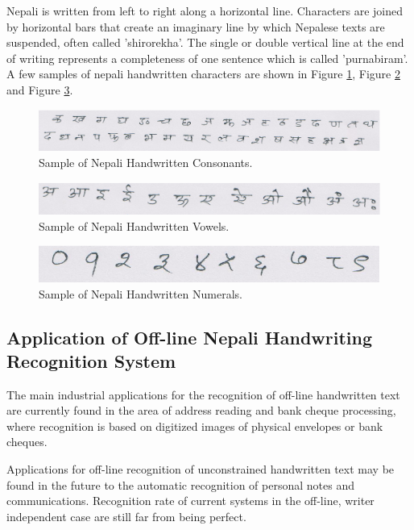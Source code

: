 Nepali is written from left to right along a horizontal line. Characters are joined by horizontal bars that create an imaginary line by which Nepalese texts are suspended, often called 'shirorekha’. The single or double vertical line at the end of writing represents a completeness of one sentence which is called 'purnabiram'. A few samples of nepali handwritten characters are shown in Figure \ref{figure_sample_ka_kha}, Figure \ref{figure_sample_a_aa} and Figure \ref{figure_sample_one_two}.
\begin{figure}[hbtp]
\centering
\includegraphics[width=\linewidth]{figures/datasets/nhcr/ka_kha.eps}
\caption{Sample of Nepali Handwritten Consonants.}
\label{figure_sample_ka_kha}
\end{figure}
\begin{figure}[hbtp]
\centering
\includegraphics[width=\linewidth]{figures/datasets/nhcr/a_aa.eps}
\caption{Sample of Nepali Handwritten Vowels.}
\label{figure_sample_a_aa}
\end{figure}

\begin{figure}[hbtp]
\centering
\includegraphics[width=\linewidth]{figures/datasets/nhcr/one_two.eps}
\caption{Sample of Nepali Handwritten Numerals.}
\label{figure_sample_one_two}
\end{figure}

\subsection{Application of Off-line Nepali Handwriting Recognition System}

The main industrial applications for the recognition of off-line handwritten text are currently found in the area of address reading and bank cheque processing, where recognition is based on digitized images of physical envelopes or bank cheques.

Applications for off-line recognition of unconstrained handwritten text may be found in the future to the automatic recognition of personal notes and communications. Recognition rate of current systems in the off-line, writer independent case are still far from being perfect.

